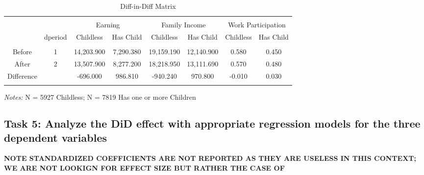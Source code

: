 \documentclass[a4paper]{article}
\begin{document}
\begin{table}[!htbp] 
\begin{adjustwidth}{-0cm}{-0cm}
\begin{threeparttable}
\small
\captionsetup{font=small, justification=raggedright,singlelinecheck=false}
  \caption{Diff-in-Diff Matrix} 
  \label{} 
\begin{tabular}{@{\extracolsep{8pt}}lccccccc} 
\\[-5.8ex]\hline 
\hline \\[-1.8ex]
\multicolumn{2}{c}{}  & \multicolumn{2}{c}{Earning}  & \multicolumn{2}{c}{Family Income} & \multicolumn{2}{c}{Work Participation} \\ 
\multicolumn{1}{c}{} & \multicolumn{1}{c}{dperiod} & \multicolumn{1}{c}{Childless} & \multicolumn{1}{c}{Has Child} & \multicolumn{1}{c}{Childless} & \multicolumn{1}{c}{Has Child} & \multicolumn{1}{c}{Childless} & \multicolumn{1}{c}{Has Child} \\ 
\hline \\[-1.8ex] 
\multicolumn{1}{c}{Before} & 1 & 14,203.900 & 7,290.380 & 19,159.190 & 12,140.900 & 0.580 & 0.450 \\ 
\multicolumn{1}{c}{After} & 2 & 13,507.900 & 8,277.200 & 18,218.950 & 13,111.690 & 0.570 & 0.480 \\ 
\multicolumn{1}{c}{Difference} &  & -696.000 & 986.810 & -940.240 & 970.800 & -0.010 & 0.030 \\ 
\hline \\[-3.6ex] 
\end{tabular} 
\begin{tablenotes}
      \small
      \item\textit{Notes:} N = 5927 Childless; N = 7819 Has one or more Children
    \end{tablenotes}
\end{threeparttable}
\end{adjustwidth}
\end{table}



\subsection{Task 5: Analyze the DiD effect with appropriate regression models for the three
dependent variables}
\textbf{NOTE STANDARDIZED COEFFICIENTS ARE NOT REPORTED AS THEY ARE USELESS IN THIS CONTEXT; WE ARE NOT LOOKIGN FOR EFFECT SIZE BUT RATHER THE CASE OF }
\end{document}
